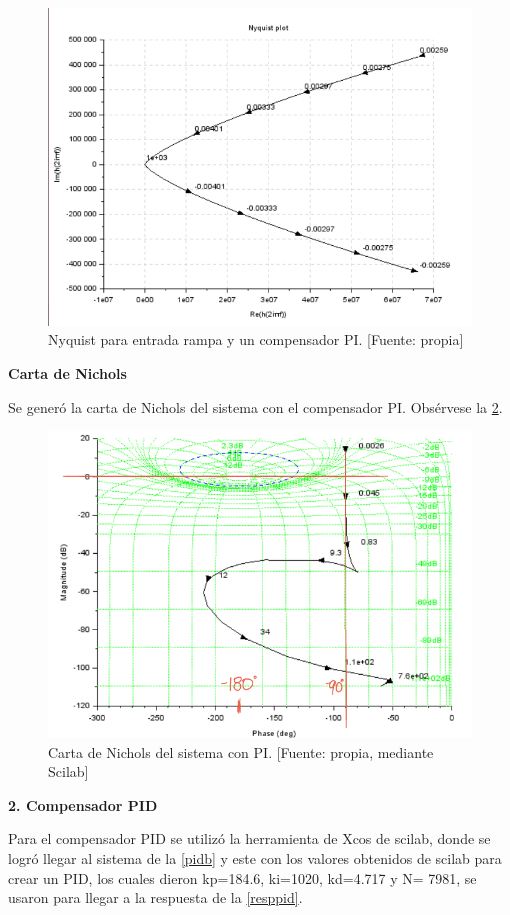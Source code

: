 \documentclass[12pt,letterpaper]{article}
\begin{document}
\begin{figure}[hbtp]
	\centering
	\includegraphics[width = .7 \columnwidth]{8b.png} 
	\caption[Figura7]{Nyquist para entrada rampa y un compensador PI. [Fuente: propia]} 
	\label{fig:fig12} 
\end{figure}

\textbf{Carta de Nichols}

Se generó la carta de Nichols del sistema con el compensador PI. Obsérvese la \ref{fig:NycholsPI}.

\begin{figure}[hbtp]
	\centering
	\includegraphics[width = 0.7 \columnwidth]{nichols2.png} 
	\caption[Figura7]{Carta de Nichols del sistema con PI. [Fuente: propia, mediante Scilab]} 
	\label{fig:NycholsPI} 
\end{figure}



\textbf{2. Compensador PID}

\bigskip

Para el compensador PID se utilizó la herramienta de Xcos de scilab, donde se logró llegar al sistema de la \ref{pidb} y este con los valores obtenidos de scilab para crear un PID, los cuales dieron kp=184.6, ki=1020, kd=4.717 y N= 7981, se usaron para llegar a la respuesta de la \ref{resppid}. \\
\end{document}
